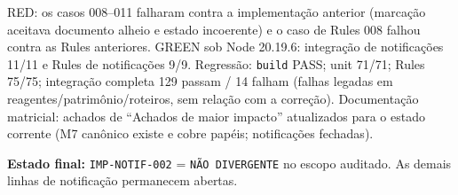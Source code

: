 RED: os casos 008--011 falharam contra a implementação anterior (marcação
aceitava documento alheio e estado incoerente) e o caso de Rules 008 falhou
contra as Rules anteriores. GREEN sob Node 20.19.6: integração de notificações
11/11 e Rules de notificações 9/9. Regressão: \texttt{build} PASS; unit 71/71;
Rules 75/75; integração completa 129 passam / 14 falham (falhas legadas em
reagentes/patrimônio/roteiros, sem relação com a correção). Documentação
matricial: achados de ``Achados de maior impacto'' atualizados para o estado
corrente (M7 canônico existe e cobre papéis; notificações fechadas).

\textbf{Estado final:} \texttt{IMP-NOTIF-002} = \texttt{NÃO DIVERGENTE} no
escopo auditado. As demais linhas de notificação permanecem abertas.
